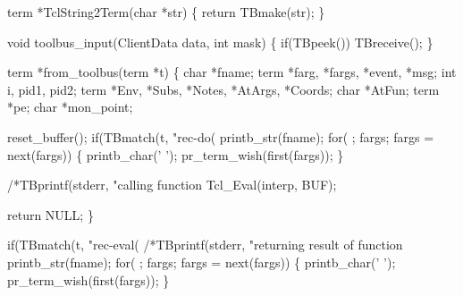 

\nwenddocs{}\endmoddef\let\nwnotused=\nwoutput{}\nwstartdeflinemarkup{}\nwenddeflinemarkup

term *TclString2Term(char *str)
\{
  return TBmake(str);
\}

\nwendcode{}\nwdocspar




\nwenddocs{}\endmoddef\let\nwnotused=\nwoutput{}\nwstartdeflinemarkup{}\nwenddeflinemarkup
void toolbus_input(ClientData data, int mask)
\{
  if(TBpeek())
    TBreceive();
\}
\nwendcode{}\nwdocspar



\nwenddocs{}\endmoddef\let\nwnotused=\nwoutput{}\nwstartdeflinemarkup{}\nwenddeflinemarkup
term *from_toolbus(term *t) 
\{
  char *fname;
  term *farg, *fargs, *event, *msg;
  int i, pid1, pid2;
  term *Env, *Subs, *Notes, *AtArgs, *Coords;
  char *AtFun;
  term *pe;
  char *mon_point;
 
  reset_buffer();
  if(TBmatch(t, "rec-do(%
    printb_str(fname);
    for( ; fargs; fargs = next(fargs)) \{
      printb_char(' ');
      pr_term_wish(first(fargs));
    \}      
    
    /*TBprintf(stderr, "calling function %
    Tcl_Eval(interp, BUF);

    return NULL;
  \}
  
  if(TBmatch(t, "rec-eval(%
    /*TBprintf(stderr, "returning result of function %
    printb_str(fname);
    for( ; fargs; fargs = next(fargs)) \{
       printb_char(' ');
       pr_term_wish(first(fargs));
    \}    

